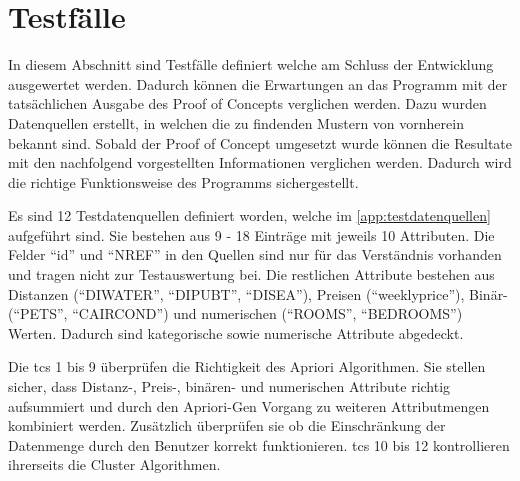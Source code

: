 \section{Testfälle}
\label{sec:recherche:testcases}

%

In diesem Abschnitt sind Testfälle definiert welche am Schluss der Entwicklung ausgewertet werden. Dadurch können die Erwartungen an das Programm mit der tatsächlichen Ausgabe des Proof of Concepts verglichen werden. Dazu wurden Datenquellen erstellt, in welchen die zu findenden Mustern von vornherein bekannt sind. Sobald der Proof of Concept umgesetzt wurde können die Resultate mit den  nachfolgend vorgestellten Informationen verglichen werden. Dadurch wird die richtige Funktionsweise des Programms sichergestellt.

Es sind 12 Testdatenquellen definiert worden, welche im \cref{app:testdatenquellen} aufgeführt sind.
Sie bestehen aus 9 - 18 Einträge mit jeweils 10 Attributen. Die Felder "`id"' und "`NREF"' in den Quellen sind nur für das Verständnis vorhanden und tragen nicht zur Testauswertung bei. Die restlichen Attribute bestehen aus Distanzen ("`DIWATER"', "`DIPUBT"', "`DISEA"'), Preisen ("`weeklyprice"'), Binär- ("`PETS"', "`CAIRCOND"') und numerischen ("`ROOMS"', "`BEDROOMS"') Werten. Dadurch sind kategorische sowie numerische Attribute abgedeckt. 

Die \glspl{tc} 1 bis 9 überprüfen die Richtigkeit des Apriori Algorithmen. Sie stellen sicher, dass Distanz-, Preis-, binären- und numerischen Attribute richtig aufsummiert und durch den Apriori-Gen Vorgang zu weiteren Attributmengen kombiniert werden. Zusätzlich überprüfen sie ob die Einschränkung der Datenmenge durch den Benutzer korrekt funktionieren. \glspl{tc} 10 bis 12 kontrollieren ihrerseits die Cluster Algorithmen. 

